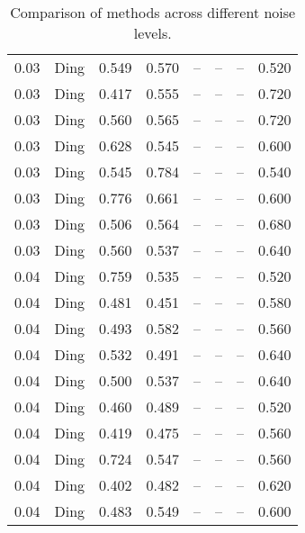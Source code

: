 \begin{table}[H]
\begin{tabular}{l c l l l}
0.03 & Ding & 0.549 & 0.570 & -- & -- & -- & 0.520 \\
0.03 & Ding & 0.417 & 0.555 & -- & -- & -- & 0.720 \\
0.03 & Ding & 0.560 & 0.565 & -- & -- & -- & 0.720 \\
0.03 & Ding & 0.628 & 0.545 & -- & -- & -- & 0.600 \\
0.03 & Ding & 0.545 & 0.784 & -- & -- & -- & 0.540 \\
0.03 & Ding & 0.776 & 0.661 & -- & -- & -- & 0.600 \\
0.03 & Ding & 0.506 & 0.564 & -- & -- & -- & 0.680 \\
0.03 & Ding & 0.560 & 0.537 & -- & -- & -- & 0.640 \\
0.04 & Ding & 0.759 & 0.535 & -- & -- & -- & 0.520 \\
0.04 & Ding & 0.481 & 0.451 & -- & -- & -- & 0.580 \\
0.04 & Ding & 0.493 & 0.582 & -- & -- & -- & 0.560 \\
0.04 & Ding & 0.532 & 0.491 & -- & -- & -- & 0.640 \\
0.04 & Ding & 0.500 & 0.537 & -- & -- & -- & 0.640 \\
0.04 & Ding & 0.460 & 0.489 & -- & -- & -- & 0.520 \\
0.04 & Ding & 0.419 & 0.475 & -- & -- & -- & 0.560 \\
0.04 & Ding & 0.724 & 0.547 & -- & -- & -- & 0.560 \\
0.04 & Ding & 0.402 & 0.482 & -- & -- & -- & 0.620 \\
0.04 & Ding & 0.483 & 0.549 & -- & -- & -- & 0.600 \\
\midrule
\bottomrule
\end{tabular}
\label{tab:SyntheticNoise}
\caption{Comparison of methods across different noise levels.}
\end{table}
